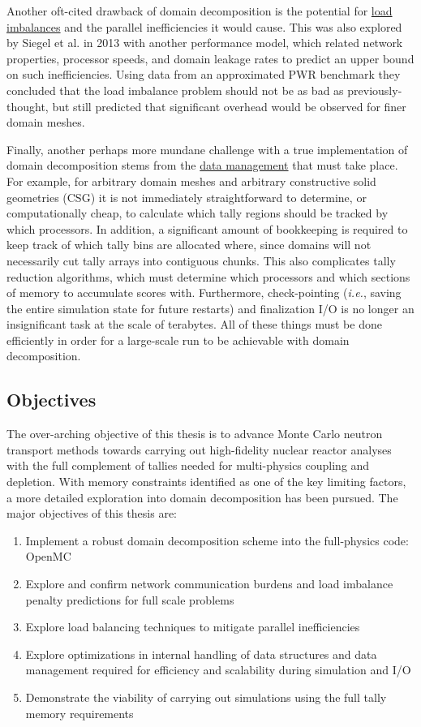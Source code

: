 \documentclass[12pt,twoside]{mitthesis-exec}
\begin{document}
Another oft-cited drawback of domain decomposition is the potential for
\ul{load imbalances} and the parallel inefficiencies it would cause.
This was also explored by Siegel et al. in 2013 \cite{Siegel2} with another
performance model, which related network properties, processor speeds, and
domain leakage rates to predict an upper bound on such inefficiencies. Using
data from an approximated PWR benchmark they concluded that the load imbalance
problem should not be as bad as previously-thought, but still predicted that
significant overhead would be observed for finer domain meshes.

Finally, another perhaps more mundane challenge with a true implementation of
domain decomposition stems from the \underline{data management} that must take
place. For example, for arbitrary domain meshes and arbitrary constructive solid geometries (CSG) it
is not immediately straightforward to determine, or computationally cheap, to
calculate which tally regions should be tracked by which processors. In
addition, a significant amount of bookkeeping is required to keep track of which
tally bins are allocated where, since domains will not necessarily cut tally
arrays into contiguous chunks. This also complicates tally reduction algorithms,
which must determine which processors and which sections of memory to accumulate
scores with. Furthermore, check-pointing (\emph{i.e.}, saving the entire simulation
state for future restarts) and finalization I/O is no longer an
insignificant task at the scale of terabytes. All of these things must be done
efficiently in order for a large-scale run to be achievable with domain
decomposition.

\subsection*{Objectives}

The over-arching objective of this thesis is to advance Monte Carlo neutron
transport methods towards carrying out high-fidelity nuclear reactor
analyses with the full complement of tallies needed for multi-physics coupling
and depletion. With memory constraints identified as one of the key limiting
factors, a more detailed exploration into domain decomposition has been pursued. The 
major objectives of this thesis are:

\begin{enumerate}
  \item Implement a robust domain decomposition scheme into the full-physics code:
  OpenMC
  \item Explore and confirm network communication burdens and load imbalance
  penalty predictions for full scale problems
  \item Explore load balancing techniques to mitigate parallel inefficiencies
  \item Explore optimizations in internal handling of data structures and data
  management required for efficiency and scalability during simulation and I/O
  \item Demonstrate the viability of carrying out simulations using the full
  tally memory requirements
\end{enumerate}
\end{document}
